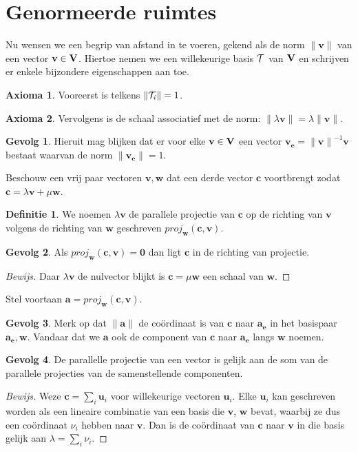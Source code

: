 \documentclass{amsart}
\theoremstyle{definition}
\newtheorem{axm}{Axioma}[section]
\newtheorem{dfn}{Definitie}[section]
\newtheorem{csq}{Gevolg}[section]
\newenvironment{bewijs}{\begin{proof}[Bewijs]}{\end{proof}}
\newcommand{\vecspace}[1][v]{\mathrm{\mathbf{\MakeUppercase#1}}}
\newcommand{\norm}[1]{\lVert{#1}\rVert}
\newcommand{\vvec}[1][v]{\mathbf{#1}}
\newcommand{\uvec}[1][v]{\vvec[#1]_\mathbf{e}}
\newcommand{\vnorm}[1]{\norm{\vvec[#1]}}
\newcommand{\zerovec}{\vvec[0]}
\newcommand{\vecrow}[1][a]{\mathcal{\MakeUppercase{#1}}}
\newcommand{\rvec}[2][i]{{#2}_{#1}}
\newcommand{\rvecr}[2][i]{\rvec[#1]{\vecrow[#2]}}
\begin{document}
\section{Genormeerde ruimtes}

Nu wensen we een begrip van afstand in te voeren, gekend als de norm $\vnorm v$ van een vector $\vvec \in \vecspace$.
Hiertoe nemen we een willekeurige basis $\vecrow[t]$ van $\vecspace$ en schrijven er enkele bijzondere eigenschappen aan toe.
\begin{axm}
	Vooreerst is telkens $\norm{\rvecr{t}} = 1$.
\end{axm}

\begin{axm}
	Vervolgens is de schaal associatief met de norm: $\norm{\lambda \vvec} = \lambda\vnorm v$.
\end{axm}

\begin{csq}
	Hieruit mag blijken dat er voor elke $\vvec \in \vecspace$ een vector $\uvec = {\vnorm v}^{-1}\vvec$ bestaat waarvan de norm $\vnorm \uvec = 1$.
\end{csq}

Beschouw een vrij paar vectoren $\vvec, \vvec[w]$ dat een derde vector $\vvec[c]$ voortbrengt zodat $\vvec[c] = \lambda \vvec + \mu \vvec[w]$.

\begin{dfn}
	We noemen $\lambda\vvec$ de parallele projectie van $\vvec[c]$ op de richting van $\vvec$ volgens de richting van $\vvec[w]$ geschreven $proj_{\vvec[w]}(\vvec[c], \vvec)$.
\end{dfn}

\begin{csq}
	Als $proj_{\vvec[w]}(\vvec[c], \vvec) = \zerovec$ dan ligt $\vvec[c]$ in de richting van projectie.
	\begin{bewijs}
		Daar $\lambda\vvec$ de nulvector blijkt is $\vvec[c] = \mu\vvec[w]$ een schaal van $\vvec[w]$.
	\end{bewijs}
\end{csq}

Stel voortaan $\vvec[a] = proj_{\vvec[w]}(\vvec[c], \vvec)$.

\begin{csq}
	Merk op dat $\vnorm{a}$ de coördinaat is van $\vvec[c]$ naar $\uvec[a]$ in het basispaar $\uvec[a], \vvec[w]$.
	Vandaar dat we $\vvec[a]$ ook de component van $\vvec[c]$ naar $\uvec[a]$ langs $\vvec[w]$ noemen.
\end{csq}

\begin{csq}
	De parallelle projectie van een vector is gelijk aan de som van de parallele projecties van de samenstellende componenten.
	\begin{bewijs}
		Weze $\vvec[c] = \sum_{i} {\vvec[u]}_i$ voor willekeurige vectoren $\vvec[u]_i$.
		Elke ${\vvec[u]}_i$ kan geschreven worden als een lineaire combinatie van een basis die $\vvec$, $\vvec[w]$ bevat, waarbij ze dus een coördinaat $\nu_i$ hebben naar $\vvec$.
		Dan is de coördinaat van $\vvec[c]$ naar $\vvec$ in die basis gelijk aan $\lambda = \sum_i \nu_i$.
	\end{bewijs}
\end{csq}
\end{document}
